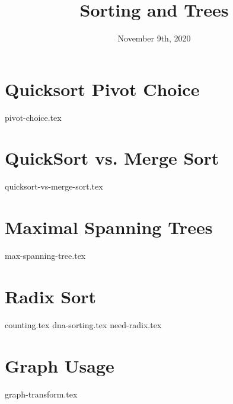 \documentclass[11pt]{exam}
\title{Sorting and Trees}
\date{November 9th, 2020}
\begin{document}
\maketitle

\section{Quicksort Pivot Choice}
\begin{questions}
{pivot-choice.tex}
\end{questions}

\pagebreak

\section{QuickSort vs. Merge Sort}
\begin{questions}
{quicksort-vs-merge-sort.tex}
\end{questions}
\clearpage

\pagebreak
\section{Maximal Spanning Trees}
\begin{questions}
{max-spanning-tree.tex}
\end{questions}

\pagebreak
\section{Radix Sort}
\begin{questions}
{counting.tex}
{dna-sorting.tex}
{need-radix.tex}
\end{questions}

\pagebreak
\section{Graph Usage}
\begin{questions}
{graph-transform.tex}
\end{questions}
\end{document}

